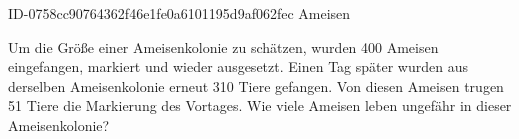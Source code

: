 \begin{exercise}
      {ID-0758cc90764362f46e1fe0a6101195d9af062fec}
      {Ameisen}
  \ifproblem\problem\par
    Um die Größe einer Ameisenkolonie zu schätzen, wurden 400 Ameisen eingefangen,
    markiert und wieder ausgesetzt. Einen Tag später wurden aus derselben
    Ameisenkolonie erneut 310 Tiere gefangen. Von diesen Ameisen trugen 51 Tiere
    die Markierung des Vortages. Wie viele Ameisen leben ungefähr in dieser
    Ameisenkolonie?
  \fi
\end{exercise}
